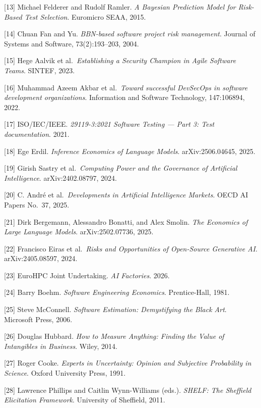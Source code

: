 \documentclass[
]{article}
\begin{document}
{[}13{]} Michael Felderer and Rudolf Ramler. \emph{A Bayesian Prediction
Model for Risk-Based Test Selection}. Euromicro SEAA, 2015.

{[}14{]} Chuan Fan and Yu. \emph{BBN-based software project risk
management}. Journal of Systems and Software, 73(2):193--203, 2004.

{[}15{]} Hege Aalvik et al.~\emph{Establishing a Security Champion in
Agile Software Teams}. SINTEF, 2023.

{[}16{]} Muhammad Azeem Akbar et al.~\emph{Toward successful DevSecOps
in software development organizations}. Information and Software
Technology, 147:106894, 2022.

{[}17{]} ISO/IEC/IEEE. \emph{29119-3:2021 Software Testing --- Part 3:
Test documentation}. 2021.

{[}18{]} Ege Erdil. \emph{Inference Economics of Language Models}.
arXiv:2506.04645, 2025.

{[}19{]} Girish Sastry et al.~\emph{Computing Power and the Governance
of Artificial Intelligence}. arXiv:2402.08797, 2024.

{[}20{]} C. André et al.~\emph{Developments in Artificial Intelligence
Markets}. OECD AI Papers No.~37, 2025.

{[}21{]} Dirk Bergemann, Alessandro Bonatti, and Alex Smolin. \emph{The
Economics of Large Language Models}. arXiv:2502.07736, 2025.

{[}22{]} Francisco Eiras et al.~\emph{Risks and Opportunities of
Open-Source Generative AI}. arXiv:2405.08597, 2024.

{[}23{]} EuroHPC Joint Undertaking. \emph{AI Factories}. 2026.

{[}24{]} Barry Boehm. \emph{Software Engineering Economics}.
Prentice-Hall, 1981.

{[}25{]} Steve McConnell. \emph{Software Estimation: Demystifying the
Black Art}. Microsoft Press, 2006.

{[}26{]} Douglas Hubbard. \emph{How to Measure Anything: Finding the
Value of Intangibles in Business}. Wiley, 2014.

{[}27{]} Roger Cooke. \emph{Experts in Uncertainty: Opinion and
Subjective Probability in Science}. Oxford University Press, 1991.

{[}28{]} Lawrence Phillips and Caitlin Wynn-Williams (eds.).
\emph{SHELF: The Sheffield Elicitation Framework}. University of
Sheffield, 2011.
\end{document}
